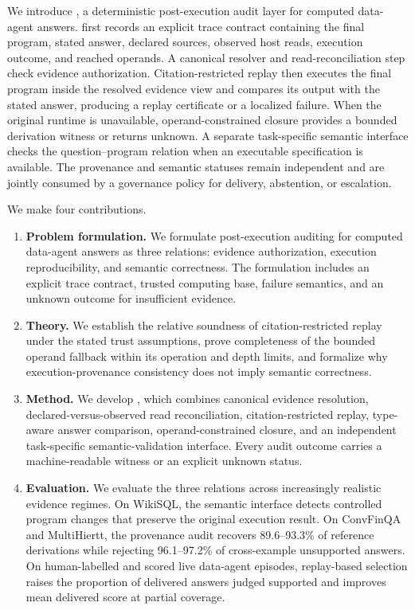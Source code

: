We introduce \ledger, a deterministic post-execution audit layer
for computed data-agent answers. \ledger first records an explicit
trace contract containing the final program, stated answer, declared
sources, observed host reads, execution outcome, and reached
operands. A canonical resolver and read-reconciliation step check
evidence authorization. Citation-restricted replay then executes the
final program inside the resolved evidence view and compares its
output with the stated answer, producing a replay certificate or a
localized failure. When the original runtime is unavailable,
operand-constrained closure provides a bounded derivation witness or
returns unknown. A separate task-specific semantic interface checks
the question--program relation when an executable specification is
available. The provenance and semantic statuses remain independent
and are jointly consumed by a governance policy for delivery,
abstention, or escalation.

We make four contributions.
\begin{enumerate}
    \setlength{\itemsep}{0pt}
    \setlength{\parskip}{0pt}

    \item \textbf{Problem formulation.}
    We formulate post-execution auditing for computed data-agent
    answers as three relations: evidence authorization, execution
    reproducibility, and semantic correctness. The formulation
    includes an explicit trace contract, trusted computing base,
    failure semantics, and an unknown outcome for insufficient
    evidence.

    \item \textbf{Theory.}
    We establish the relative soundness of citation-restricted
    replay under the stated trust assumptions, prove completeness
    of the bounded operand fallback within its operation and depth
    limits, and formalize why execution-provenance consistency does
    not imply semantic correctness.

    \item \textbf{Method.}
    We develop \ledger, which combines canonical evidence
    resolution, declared-versus-observed read reconciliation,
    citation-restricted replay, type-aware answer comparison,
    operand-constrained closure, and an independent task-specific
    semantic-validation interface. Every audit outcome carries a
    machine-readable witness or an explicit unknown status.

    \item \textbf{Evaluation.}
    We evaluate the three relations across increasingly realistic
    evidence regimes. On WikiSQL, the semantic interface detects
    controlled program changes that preserve the original execution
    result. On ConvFinQA and MultiHiertt, the provenance audit
    recovers 89.6--93.3\% of reference derivations while rejecting
    96.1--97.2\% of cross-example unsupported answers. On
    human-labelled and scored live data-agent episodes, replay-based
    selection raises the proportion of delivered answers judged
    supported and improves mean delivered score at partial coverage.
\end{enumerate}

